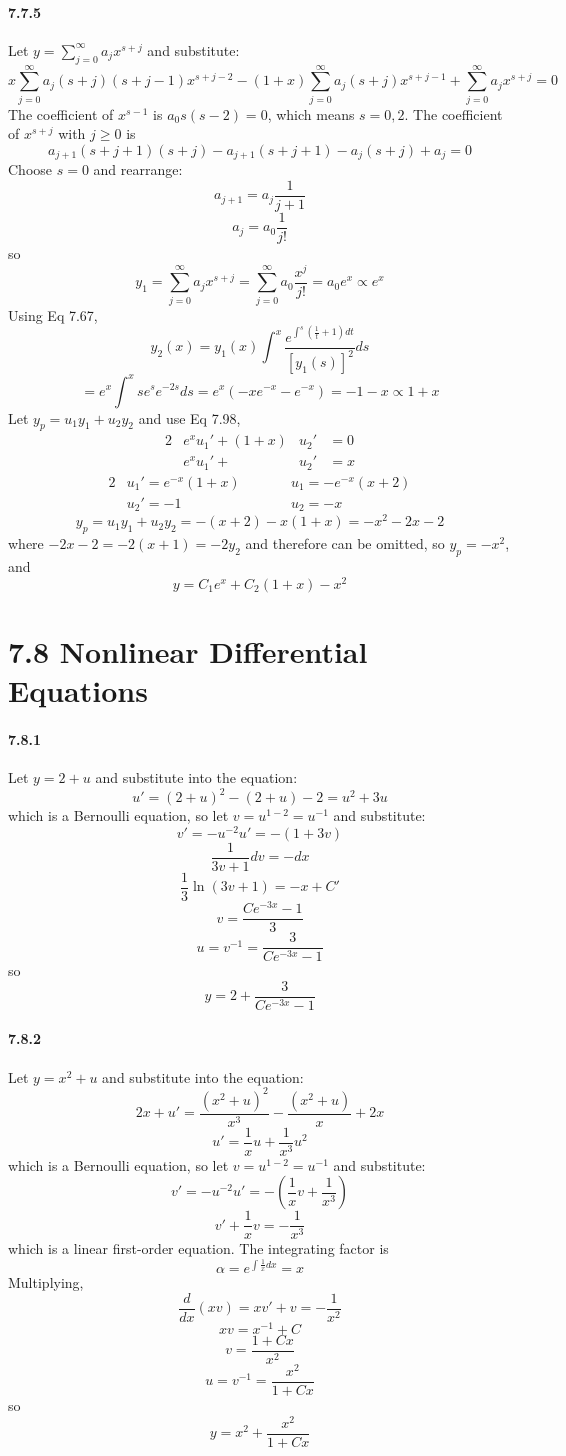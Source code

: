 \documentclass[a4paper]{article}
\begin{document}
\paragraph{7.7.5}
Let $y=\sum_{j=0}^\infty a_jx^{s+j}$ and substitute:
\[
x\sum_{j=0}^\infty a_j(s+j)(s+j-1)x^{s+j-2}-(1+x)\sum_{j=0}^\infty a_j(s+j)x^{s+j-1}+\sum_{j=0}^\infty a_jx^{s+j}=0
\]
The coefficient of $x^{s-1}$ is $a_0s(s-2)=0$, which means $s=0,2$. The coefficient of $x^{s+j}$ with $j\geq0$ is 
\[
a_{j+1}(s+j+1)(s+j)-a_{j+1}(s+j+1)-a_j(s+j)+a_j=0
\]
Choose $s=0$ and rearrange:
\[
a_{j+1}=a_j\frac{1}{j+1}
\]
\[
a_j=a_0\frac{1}{j!}
\]
so
\[
y_1=\sum_{j=0}^\infty a_jx^{s+j}=\sum_{j=0}^\infty a_0\frac{x^j}{j!}=a_0e^x\propto e^x
\]
Using Eq 7.67,
\[
y_2(x)=y_1(x)\int^x\frac{e^{\int^s(\frac{1}{t}+1)dt}}{[y_1(s)]^2}ds
\]
\[
=e^x\int^xse^se^{-2s}ds=e^x(-xe^{-x}-e^{-x})=-1-x\propto 1+x
\]
Let $y_p=u_1y_1+u_2y_2$ and use Eq 7.98,
\begin{alignat*}{2}
    & e^xu_1'+(1+x)&u_2'&=0\\
    & e^xu_1'+&u_2'&=x
\end{alignat*}
\begin{alignat*}{2}
    & u_1'=e^{-x}(1+x)\qquad && u_1=-e^{-x}(x+2)\\
    & u_2'=-1\qquad && u_2=-x
\end{alignat*}
\[
y_p=u_1y_1+u_2y_2=-(x+2)-x(1+x)=-x^2-2x-2
\]
where $-2x-2=-2(x+1)=-2y_2$ and therefore can be omitted, so $y_p=-x^2$, and 
\[
y=C_1e^x+C_2(1+x)-x^2
\]

\section*{7.8 Nonlinear Differential Equations}

\paragraph{7.8.1}
Let $y=2+u$ and substitute into the equation:
\[
u'=(2+u)^2-(2+u)-2=u^2+3u
\]
which is a Bernoulli equation, so let $v=u^{1-2}=u^{-1}$ and substitute:
\[
v'=-u^{-2}u'=-(1+3v)
\]
\[
\frac{1}{3v+1}dv=-dx
\]
\[
\frac{1}{3}\ln(3v+1)=-x+C'
\]
\[
v=\frac{Ce^{-3x}-1}{3}
\]
\[
u=v^{-1}=\frac{3}{Ce^{-3x}-1}
\]
so
\[
y=2+\frac{3}{Ce^{-3x}-1}
\]

\paragraph{7.8.2}
Let $y=x^2+u$ and substitute into the equation:
\[
2x+u'=  \frac{(x^2+u)^2}{x^3}-\frac{(x^2+u)}{x}+2x
\]
\[
u'=\frac{1}{x}u+\frac{1}{x^3}u^2
\]
which is a Bernoulli equation, so let $v=u^{1-2}=u^{-1}$ and substitute:
\[
v'=-u^{-2}u'=-(\frac{1}{x}v+\frac{1}{x^3})
\]
\[
v'+\frac{1}{x}v=-\frac{1}{x^3}
\]
which is a linear first-order equation. The integrating factor is 
\[
\alpha=e^{\int\frac{1}{x}dx}=x
\]
Multiplying,
\[
\frac{d}{dx}(xv)=xv'+v=-\frac{1}{x^2}
\]
\[
xv=x^{-1}+C
\]
\[
v=\frac{1+Cx}{x^2}
\]
\[
u=v^{-1}=\frac{x^2}{1+Cx}
\]
so
\[
y=x^2+\frac{x^2}{1+Cx}
\]
\end{document}
